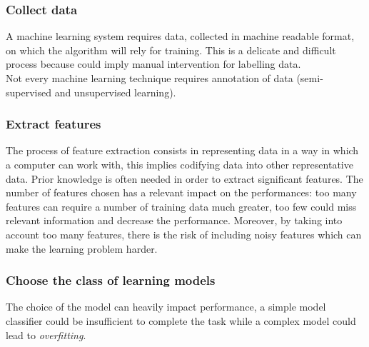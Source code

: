 \subsubsection*{Collect data}
A machine learning system requires data, collected in machine readable format, on
which the algorithm will rely for training. This is a delicate and difficult
process because could imply manual intervention for labelling data.\\ Not every
machine learning technique requires annotation of data (semi-supervised and unsupervised
learning).

\subsubsection*{Extract features}
The process of feature extraction consists in representing data in a way in
which a computer can work with, this implies codifying data into other representative
data. Prior knowledge is often needed in order to extract significant features. The
number of features chosen has a relevant impact on the performances: too many
features can require a number of training data much greater, too few could miss relevant
information and decrease the performance. Moreover, by taking into account too many
features, there is the risk of including noisy features which can make the
learning problem harder.

\subsubsection*{Choose the class of learning models}
The choice of the model can heavily impact performance, a simple model classifier
could be insufficient to complete the task while a complex model could lead to \textit{overfitting}.

